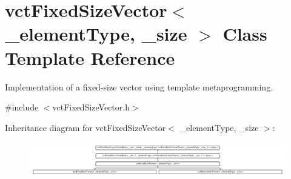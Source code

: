 \hypertarget{classvct_fixed_size_vector}{}\section{vct\+Fixed\+Size\+Vector$<$ \+\_\+element\+Type, \+\_\+size $>$ Class Template Reference}
\label{classvct_fixed_size_vector}


Implementation of a fixed-\/size vector using template metaprogramming.  




{\ttfamily \#include $<$vct\+Fixed\+Size\+Vector.\+h$>$}

Inheritance diagram for vct\+Fixed\+Size\+Vector$<$ \+\_\+element\+Type, \+\_\+size $>$\+:\begin{figure}[H]
\begin{center}
\leavevmode
\includegraphics[height=1.555556cm]{d6/d2d/classvct_fixed_size_vector}
\end{center}
\end{figure}
